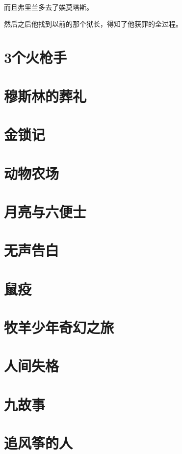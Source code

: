 \documentclass[UTF8,a4paper,12pt]{ctexbook}
\begin{document}
		而且弗里兰多去了娭莫塔斯。
		
		然后之后他找到以前的那个狱长，得知了他获罪的全过程。
		
		
	\section{3个火枪手}	
	
	\section{穆斯林的葬礼}
	
	\section{金锁记}
	
	\section{动物农场}
	
	\section{月亮与六便士}
	
	\section{无声告白}
	
	\section{鼠疫}
	
	\section{牧羊少年奇幻之旅}
	
	\section{人间失格}
	
	\section{九故事}
	
	\section{追风筝的人}
	
\end{document}
